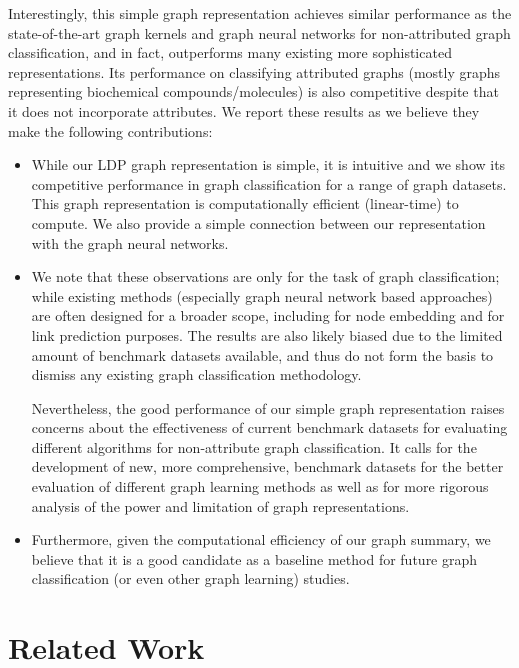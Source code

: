 \documentclass[11pt,onecolumn]{article}
\begin{document}
Interestingly, this simple graph representation achieves similar performance as the state-of-the-art graph kernels and graph neural networks for non-attributed graph classification, and in fact, outperforms many existing more sophisticated representations. Its performance on classifying attributed graphs (mostly graphs representing biochemical compounds/molecules) is also competitive despite that it does not incorporate attributes. 
We report these results as we believe they make the following contributions: 
\begin{itemize}
    \item While our LDP graph representation is simple, it is intuitive and we show its competitive performance in graph classification for a range of graph datasets. This graph representation is computationally efficient (linear-time) to compute. We also provide a simple connection between our representation with the graph neural networks. 
    \item We note that these observations are only for the task of graph classification; while existing methods (especially graph neural network based approaches) are often designed for a broader scope, including for node embedding and for link prediction purposes. The results are also likely biased due to the limited amount of benchmark datasets available, and thus do not form the basis to dismiss any existing graph classification methodology.  

    Nevertheless, the good performance of our simple graph representation raises concerns about the effectiveness of current benchmark datasets for evaluating different algorithms for non-attribute graph classification. It calls for the development of new, more comprehensive, benchmark datasets for the better evaluation of different graph learning methods as well as for more rigorous analysis of the power and limitation of graph representations. 
    \item Furthermore, given the computational efficiency of our graph summary, we believe that it is a good candidate as a baseline method for future graph classification (or even other graph learning) studies.  
\end{itemize}


\section{Related Work} 
\end{document}
